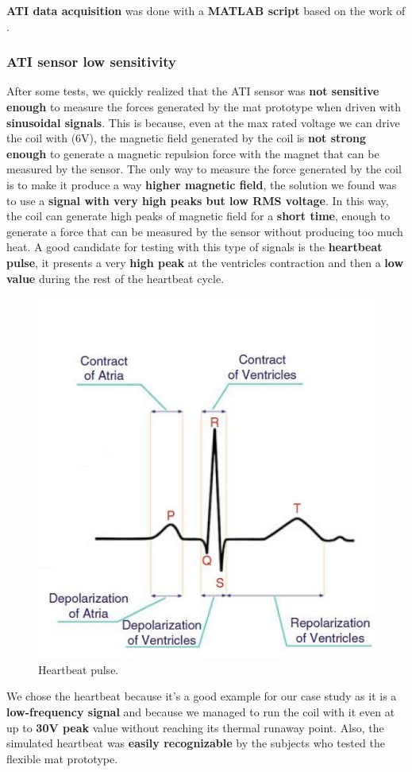 \textbf{ATI data acquisition} was done with a \textbf{MATLAB script} based on the work of \cite{ATI_NetFT_MatlabInterface}.

\subsubsection{ATI sensor low sensitivity}
After some tests, we quickly realized that the ATI sensor was \textbf{not sensitive enough} to measure the forces generated by the mat prototype when driven with \textbf{sinusoidal signals}.
This is because, even at the max rated voltage we can drive the coil with (6V), the magnetic field generated by the coil is \textbf{not strong enough} to generate a magnetic repulsion force with the magnet that can be measured by the sensor.
The only way to measure the force generated by the coil is to make it produce a way \textbf{higher magnetic field}, the solution we found was to use a \textbf{signal with very high peaks but low RMS voltage}.
In this way, the coil can generate high peaks of magnetic field for a \textbf{short time}, enough to generate a force that can be measured by the sensor without producing too much heat.
A good candidate for testing with this type of signals is the \textbf{heartbeat pulse}, it presents a very \textbf{high peak} at the ventricles contraction and then a \textbf{low value} during the rest of the heartbeat cycle.
\begin{figure}[H]
    \centering
    \includegraphics[width = 0.5\linewidth]{Chapters/Chapter5/Exp_Evaluation/Figures/heartbeat_pulse.png}
    \caption{Heartbeat pulse.}
    \label{fig: Heartbeat_pulse}
\end{figure}

We chose the heartbeat because it's a good example for our case study as it is a \textbf{low-frequency signal} and because we managed to run the coil with it even at up to \textbf{30V peak }value without reaching its thermal runaway point.
Also, the simulated heartbeat was \textbf{easily recognizable} by the subjects who tested the flexible mat prototype.

